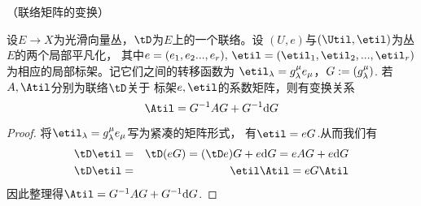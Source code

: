 

\begin{prop}（联络矩阵的变换）

设$E\to X$为光滑向量丛，$\tD$为$E$上的一个联络。设
$(U,e)$与$(\Util,\etil)$为丛$E$的两个局部平凡化，
其中$e=(e_1,e_2...,e_r),\,\etil=(\etil_1,\etil_2,...,\etil_r)$
为相应的局部标架。记它们之间的转移函数为
$\etil_\lmd=g_\lmd^\mu e_\mu$，$G:=(g_\lambda^\mu)$.
若$A,\Atil$分别为联络$\tD$关于
标架$e,\etil$的系数矩阵，则有变换关系
$$
  \Atil
=
  G^{-1}AG+G^{-1}\td G
$$
\end{prop}

\begin{proof}
将$\etil_\lmd=g_\lmd^\mu e_\mu$写为紧凑的矩阵形式，
有$\etil=eG$.从而我们有
\begin{eqnarray*}
\tD\etil&=&\tD(eG)=(\tD e)G+e\td G=eAG+e\td G\\
\tD\etil&=&\etil\Atil=eG\Atil
\end{eqnarray*}
因此整理得$\Atil=G^{-1}AG+G^{-1}\td G$.
\end{proof}


